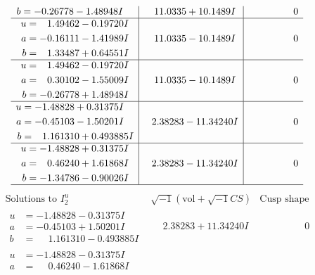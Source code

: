 \documentclass[1p]{elsarticle_modified}
\theoremstyle{definition}
\newcommand{\I}{\sqrt{-1}}
\begin{document}
$$\begin{array}{c|c|c}
\begin{aligned}
b &= -0.26778 - 1.48948 I\end{aligned}
 & \phantom{-}11.0335 + 10.1489 I & \phantom{-0.000000 } 0 \\ \hline\begin{aligned}
u &= \phantom{-}1.49462 - 0.19720 I \\
a &= -0.16111 - 1.41989 I \\
b &= \phantom{-}1.33487 + 0.64551 I\end{aligned}
 & \phantom{-}11.0335 - 10.1489 I & \phantom{-0.000000 } 0 \\ \hline\begin{aligned}
u &= \phantom{-}1.49462 - 0.19720 I \\
a &= \phantom{-}0.30102 - 1.55009 I \\
b &= -0.26778 + 1.48948 I\end{aligned}
 & \phantom{-}11.0335 - 10.1489 I & \phantom{-0.000000 } 0 \\ \hline\begin{aligned}
u &= -1.48828 + 0.31375 I \\
a &= -0.45103 - 1.50201 I \\
b &= \phantom{-}1.161310 + 0.493885 I\end{aligned}
 & \phantom{-}2.38283 - 11.34240 I & \phantom{-0.000000 } 0 \\ \hline\begin{aligned}
u &= -1.48828 + 0.31375 I \\
a &= \phantom{-}0.46240 + 1.61868 I \\
b &= -1.34786 - 0.90026 I\end{aligned}
 & \phantom{-}2.38283 - 11.34240 I & \phantom{-0.000000 } 0\\
 \hline 
 \end{array}$$\newpage$$\begin{array}{c|c|c}  
\text{Solutions to }I^u_{2}& \I (\text{vol} + \sqrt{-1}CS) & \text{Cusp shape}\\
 \hline 
\begin{aligned}
u &= -1.48828 - 0.31375 I \\
a &= -0.45103 + 1.50201 I \\
b &= \phantom{-}1.161310 - 0.493885 I\end{aligned}
 & \phantom{-}2.38283 + 11.34240 I & \phantom{-0.000000 } 0 \\ \hline\begin{aligned}
u &= -1.48828 - 0.31375 I \\
a &= \phantom{-}0.46240 - 1.61868 I \\

\end{aligned}
\end{array}$$
\end{document}
